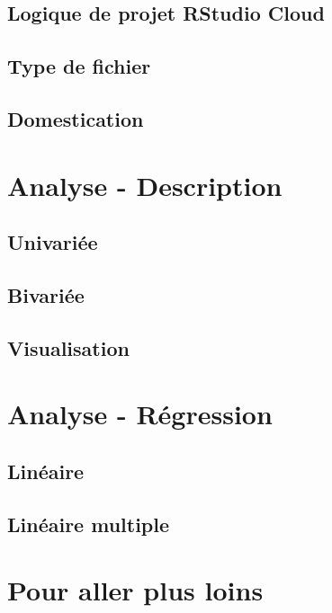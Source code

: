 \documentclass[10.5pt,a4paper]{article}
\begin{document}
  \subsection{Logique de projet RStudio Cloud}
  \subsection{Type de fichier}
  \subsection{Domestication}

  
\section{Analyse - Description}
  \subsection{Univariée}
  \subsection{Bivariée}
  \subsection{Visualisation}


\section{Analyse - Régression}
  \subsection{Linéaire}
  \subsection{Linéaire multiple}

  
\section{Pour aller plus loins}
 
%
%
\end{document}
